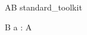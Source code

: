 \begin{zsection}
  \SECTION AB \parents standard\_toolkit
\end{zsection}

\begin{zed}
[A]
\end{zed}

\begin{schema}{B}
a : \power A
\end{schema}